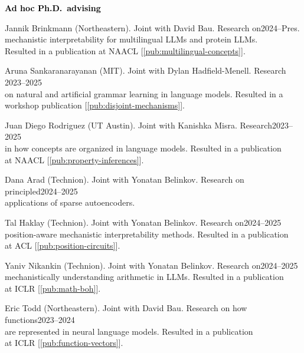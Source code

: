 \documentclass[10pt]{article}
\renewcommand{\subsection}[1]{\textcolor{black}{#1}}
\begin{document}
	\subsection{\textbf{Ad hoc Ph.D.\ advising}}
	\begin{innerlist}
	\item Jannik Brinkmann (Northeastern). Joint with David Bau. Research on\hfill 2024--Pres.\\
	      mechanistic interpretability for multilingual LLMs and protein LLMs.\\Resulted
		  in a publication at NAACL [\ref{pub:multilingual-concepts}].
	\item Aruna Sankaranarayanan (MIT). Joint with Dylan Hadfield-Menell. Research \hfill 2023--2025\\
	on natural and artificial grammar learning in language models. Resulted in a\\workshop publication [\ref{pub:disjoint-mechanisms}].
	\item Juan Diego Rodriguez (UT Austin). Joint with Kanishka Misra. Research\hfill 2023--2025\\
	in how concepts are organized in language models. Resulted in a publication\\at NAACL [\ref{pub:property-inferences}].
	\item Dana Arad (Technion). Joint with Yonatan Belinkov. Research on principled\hfill 2024--2025\\applications of sparse autoencoders.
	\item Tal Haklay (Technion). Joint with Yonatan Belinkov. Research on\hfill 2024--2025\\position-aware mechanistic interpretability methods.
	      Resulted in a publication\\at ACL [\ref{pub:position-circuits}].
	\item Yaniv Nikankin (Technion). Joint with Yonatan Belinkov. Research on\hfill 2024--2025\\mechanistically understanding arithmetic in LLMs.
	      Resulted in a publication\\at ICLR [\ref{pub:math-boh}].
	\item Eric Todd (Northeastern). Joint with David Bau. Research on how functions\hfill 2023--2024\\are
		  represented in neural language models. Resulted in a publication\\at ICLR [\ref{pub:function-vectors}].
	\end{innerlist}
\end{document}
